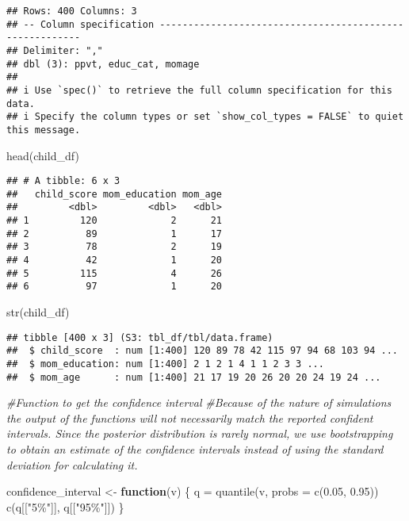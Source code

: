 \documentclass[
]{article}
\newenvironment{Shaded}{\begin{snugshade}}{\end{snugshade}}
\newcommand{\AttributeTok}[1]{\textcolor[rgb]{0.77,0.63,0.00}{#1}}
\newcommand{\CommentTok}[1]{\textcolor[rgb]{0.56,0.35,0.01}{\textit{#1}}}
\newcommand{\ControlFlowTok}[1]{\textcolor[rgb]{0.13,0.29,0.53}{\textbf{#1}}}
\newcommand{\FloatTok}[1]{\textcolor[rgb]{0.00,0.00,0.81}{#1}}
\newcommand{\FunctionTok}[1]{\textcolor[rgb]{0.00,0.00,0.00}{#1}}
\newcommand{\NormalTok}[1]{#1}
\newcommand{\OtherTok}[1]{\textcolor[rgb]{0.56,0.35,0.01}{#1}}
\newcommand{\StringTok}[1]{\textcolor[rgb]{0.31,0.60,0.02}{#1}}
\begin{document}
\begin{verbatim}
## Rows: 400 Columns: 3
## -- Column specification --------------------------------------------------------
## Delimiter: ","
## dbl (3): ppvt, educ_cat, momage
## 
## i Use `spec()` to retrieve the full column specification for this data.
## i Specify the column types or set `show_col_types = FALSE` to quiet this message.
\end{verbatim}

\begin{Shaded}
\begin{Highlighting}[]
\FunctionTok{head}\NormalTok{(child\_df)}
\end{Highlighting}
\end{Shaded}

\begin{verbatim}
## # A tibble: 6 x 3
##   child_score mom_education mom_age
##         <dbl>         <dbl>   <dbl>
## 1         120             2      21
## 2          89             1      17
## 3          78             2      19
## 4          42             1      20
## 5         115             4      26
## 6          97             1      20
\end{verbatim}

\begin{Shaded}
\begin{Highlighting}[]
\FunctionTok{str}\NormalTok{(child\_df)}
\end{Highlighting}
\end{Shaded}

\begin{verbatim}
## tibble [400 x 3] (S3: tbl_df/tbl/data.frame)
##  $ child_score  : num [1:400] 120 89 78 42 115 97 94 68 103 94 ...
##  $ mom_education: num [1:400] 2 1 2 1 4 1 1 2 3 3 ...
##  $ mom_age      : num [1:400] 21 17 19 20 26 20 20 24 19 24 ...
\end{verbatim}

\begin{Shaded}
\begin{Highlighting}[]
\CommentTok{\#Function to get the confidence interval}
\CommentTok{\#Because of the nature of simulations the output of the functions will not necessarily match the reported confident intervals. Since the posterior distribution is rarely normal, we use bootstrapping to obtain an estimate of the confidence intervals instead of using the standard deviation for calculating it.}

\NormalTok{confidence\_interval }\OtherTok{\textless{}{-}} \ControlFlowTok{function}\NormalTok{(v) \{}
\NormalTok{  q }\OtherTok{=} \FunctionTok{quantile}\NormalTok{(v, }\AttributeTok{probs =} \FunctionTok{c}\NormalTok{(}\FloatTok{0.05}\NormalTok{, }\FloatTok{0.95}\NormalTok{))}
  \FunctionTok{c}\NormalTok{(q[[}\StringTok{"5\%"}\NormalTok{]], q[[}\StringTok{"95\%"}\NormalTok{]])}
\NormalTok{\}}
\end{Highlighting}
\end{Shaded}
\end{document}
